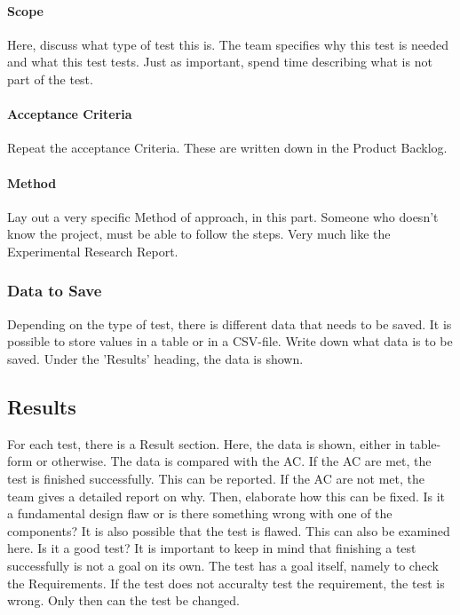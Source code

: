 \documentclass[10pt]{report}
\begin{document}
\paragraph{Scope}

Here, discuss what type of test this is. The team specifies why this test is needed and what this test tests. Just as important, spend time describing what is not part of the test.

\paragraph{Acceptance Criteria}

Repeat the acceptance Criteria. These are written down in the Product Backlog.

\paragraph{Method}

Lay out a very specific Method of approach, in this part. Someone who doesn't know the project, must be able to follow the steps. Very much like the Experimental Research Report.

\subsubsection{Data to Save}

Depending on the type of test, there is different data that needs to be saved. It is possible to store values in a table or in a CSV-file. Write down what data is to be saved. Under the 'Results' heading, the data is shown.

\subsection{Results}

For each test, there is a Result section. Here, the data is shown, either in table-form or otherwise. The data is compared with the AC. If the AC are met, the test is finished successfully. This can be reported. If the AC are not met, the team gives a detailed report on why. Then, elaborate how this can be fixed. Is it a fundamental design flaw or is there something wrong with one of the components? It is also possible that the test is flawed. This can also be examined here. Is it a good test? It is important to keep in mind that finishing a test successfully is not a goal on its own. The test has a goal itself, namely to check the Requirements. If the test does not accuralty test the requirement, the test is wrong. Only then can the test be changed.
\end{document}
